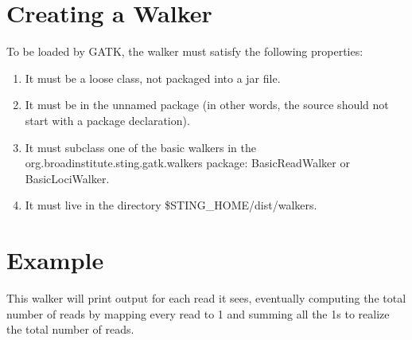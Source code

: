 \documentclass[11pt,fullpage]{article}
\begin{document}
\section{Creating a Walker}
To be loaded by GATK, the walker must satisfy the following properties:
\begin{enumerate}
  \item It must be a loose class, not packaged into a jar file.
  \item It must be in the unnamed package (in other words, the source
    should not start with a package declaration).
  \item It must subclass one of the basic walkers in the 
    org.broadinstitute.sting.gatk.walkers package: BasicReadWalker or 
    BasicLociWalker.
  \item It must live in the directory \$STING\_HOME/dist/walkers.
\end{enumerate}

\section{Example}
This walker will print output for each read it sees, eventually computing the
total number of reads by mapping every read to 1 and summing all the 1s to
realize the total number of reads.
\end{document}
